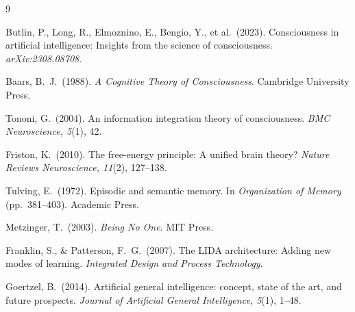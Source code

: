\documentclass[11pt,a4paper]{article}
\begin{document}
\begin{thebibliography}{9}

Butlin, P., Long, R., Elmoznino, E., Bengio, Y., et al.\ (2023).
Consciousness in artificial intelligence: Insights from the science of consciousness.
\textit{arXiv:2308.08708}.

Baars, B.\ J.\ (1988).
\textit{A Cognitive Theory of Consciousness}.
Cambridge University Press.

Tononi, G.\ (2004).
An information integration theory of consciousness.
\textit{BMC Neuroscience, 5}(1), 42.

Friston, K.\ (2010).
The free-energy principle: A unified brain theory?
\textit{Nature Reviews Neuroscience, 11}(2), 127--138.

Tulving, E.\ (1972).
Episodic and semantic memory.
In \textit{Organization of Memory} (pp.\ 381--403). Academic Press.

Metzinger, T.\ (2003).
\textit{Being No One}. MIT Press.

Franklin, S., \& Patterson, F.\ G.\ (2007).
The LIDA architecture: Adding new modes of learning.
\textit{Integrated Design and Process Technology}.

Goertzel, B.\ (2014).
Artificial general intelligence: concept, state of the art, and future prospects.
\textit{Journal of Artificial General Intelligence, 5}(1), 1--48.

\end{thebibliography}
\end{document}
